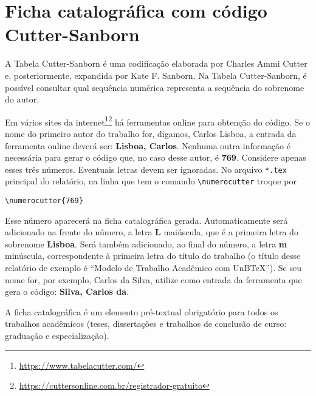 \section{Ficha catalográfica com código Cutter-Sanborn}
A Tabela Cutter-Sanborn é uma codificação elaborada por Charles Ammi Cutter e, posteriormente, expandida por Kate F. Sanborn. Na Tabela Cutter-Sanborn, é possível consultar qual sequência numérica representa a sequência do sobrenome do autor.

Em vários sites da internet\footnote{\url{https://www.tabelacutter.com/}}\footnote{\url{https://cuttersonline.com.br/registrador-gratuito}} há ferramentas online para obtenção do código. Se o nome do primeiro autor do trabalho for, digamos, Carlos Lisboa, a entrada da ferramenta online deverá ser: \textbf{Lisboa, Carlos}. Nenhuma outra informação é necessária para gerar o código que, no caso desse autor, é \textbf{769}. Considere apenas esses três números. Eventuais letras devem ser ignoradas. No arquivo \verb|*.tex| principal do relatório, na linha que tem o comando \verb|\numerocutter| troque por

\begin{verbatim}
\numerocutter{769}
\end{verbatim}

Esse número aparecerá na ficha catalográfica gerada. Automaticamente será adicionado na frente do número, a letra \textbf{L} maiúscula, que é a primeira letra do sobrenome \textbf{Lisboa}. Será também adicionado, ao final do número, a letra \textbf{m} minúscula, correspondente à primeira letra do título do trabalho (o título desse relatório de exemplo é ``Modelo de Trabalho Acadêmico com UnB\TeX''). Se seu nome for, por exemplo, Carlos da Silva, utilize como entrada da ferramenta que gera o código: \textbf{Silva, Carlos da}.

A ficha catalográfica é um elemento pré-textual obrigatório para todos os trabalhos acadêmicos (teses, dissertações e trabalhos de conclusão de curso: graduação e especialização).